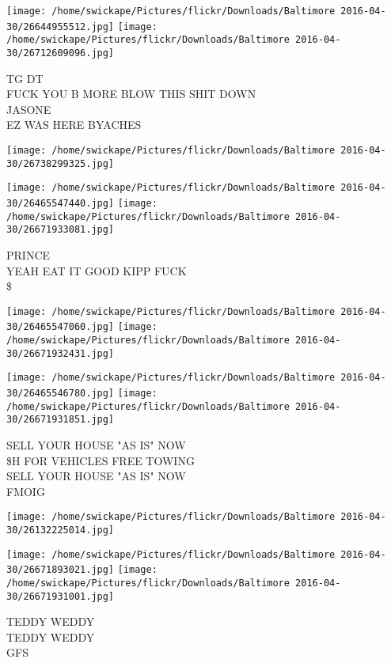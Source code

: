 \documentclass[10pt,letterpaper]{article}
\begin{document}
\texttt{[image: /home/swickape/Pictures/flickr/Downloads/Baltimore 2016-04-30/26644955512.jpg]}
\texttt{[image: /home/swickape/Pictures/flickr/Downloads/Baltimore 2016-04-30/26712609096.jpg]}

TG DT\\
FUCK YOU B MORE BLOW THIS SHIT DOWN\\
JASONE\\
EZ WAS HERE BYACHES\\
\pagebreak

\texttt{[image: /home/swickape/Pictures/flickr/Downloads/Baltimore 2016-04-30/26738299325.jpg]}

\vspace{0.25in}
\texttt{[image: /home/swickape/Pictures/flickr/Downloads/Baltimore 2016-04-30/26465547440.jpg]}
\texttt{[image: /home/swickape/Pictures/flickr/Downloads/Baltimore 2016-04-30/26671933081.jpg]}

PRINCE\\
YEAH EAT IT GOOD KIPP FUCK\\
\$\\
\pagebreak

\texttt{[image: /home/swickape/Pictures/flickr/Downloads/Baltimore 2016-04-30/26465547060.jpg]}
\texttt{[image: /home/swickape/Pictures/flickr/Downloads/Baltimore 2016-04-30/26671932431.jpg]}

\texttt{[image: /home/swickape/Pictures/flickr/Downloads/Baltimore 2016-04-30/26465546780.jpg]}
\texttt{[image: /home/swickape/Pictures/flickr/Downloads/Baltimore 2016-04-30/26671931851.jpg]}

SELL YOUR HOUSE "AS IS" NOW\\
\$H FOR VEHICLES FREE TOWING\\
SELL YOUR HOUSE "AS IS" NOW\\
FMOIG\\
\pagebreak

\texttt{[image: /home/swickape/Pictures/flickr/Downloads/Baltimore 2016-04-30/26132225014.jpg]}

\vspace{0.25in}
\texttt{[image: /home/swickape/Pictures/flickr/Downloads/Baltimore 2016-04-30/26671893021.jpg]}
\texttt{[image: /home/swickape/Pictures/flickr/Downloads/Baltimore 2016-04-30/26671931001.jpg]}

TEDDY WEDDY\\
TEDDY WEDDY\\
GFS\\
\pagebreak
\end{document}
